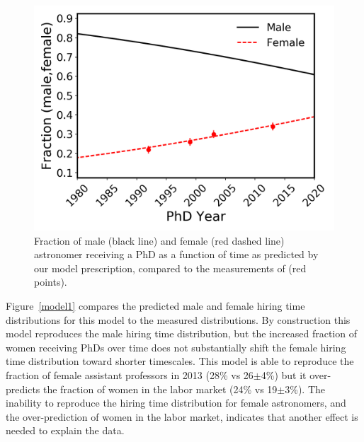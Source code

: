 \documentclass[modern]{aastex62}
\begin{document}
\begin{figure}[!hbt]
\center
\includegraphics[scale=.6]{f_phd.png}
\caption{Fraction of male (black line) and female (red dashed line) astronomer receiving a PhD as a function of time as predicted by our model prescription, compared to the measurements of \citet{hug14} (red points).\label{f_phd}}
\end{figure}

Figure~\ref{model1} compares the predicted male and female hiring time distributions for this model to the measured distributions. By construction this model reproduces the male hiring time distribution, but the increased fraction of women receiving PhDs over time does not substantially shift the female hiring time distribution toward shorter timescales. This model is able to reproduce the fraction of female assistant professors in 2013 (28\% vs 26$\pm$4\%) but it over-predicts the fraction of women in the labor market (24\% vs 19$\pm$3\%). The inability to reproduce the hiring time distribution for female astronomers, and the over-prediction of women in the labor market, indicates that another effect is needed to explain the data. 
\end{document}
